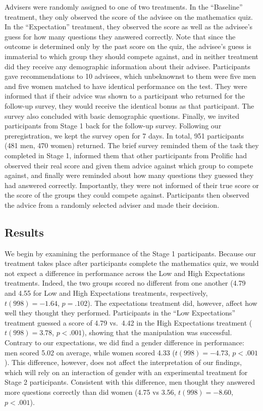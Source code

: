\documentclass[
  man,floatsintext]{apa6}
\begin{document}
Advisers were randomly assigned to one of two treatments. In the ``Baseline'' treatment, they only observed the score of the advisee on the mathematics quiz. In the ``Expectation'' treatment, they observed the score as well as the advisee's guess for how many questions they answered correctly. Note that since the outcome is determined only by the past score on the quiz, the advisee's guess is immaterial to which group they should compete against, and in neither treatment did they receive any demographic information about their advisee. Participants gave recommendations to 10 advisees, which unbeknownst to them were five men and five women matched to have identical performance on the test. They were informed that if their advice was shown to a participant who returned for the follow-up survey, they would receive the identical bonus as that participant. The survey also concluded with basic demographic questions.
Finally, we invited participants from Stage 1 back for the follow-up survey. Following our preregistration, we kept the survey open for 7 days. In total, 951 participants (481 men, 470 women) returned. The brief survey reminded them of the task they completed in Stage 1, informed them that other participants from Prolific had observed their real score and given them advice against which group to compete against, and finally were reminded about how many questions they guessed they had answered correctly. Importantly, they were not informed of their true score or the score of the groups they could compete against. Participants then observed the advice from a randomly selected adviser and made their decision.

\hypertarget{results}{%
\subsection{Results}\label{results}}

We begin by examining the performance of the Stage 1 participants. Because our treatment takes place after participants complete the mathematics quiz, we would not expect a difference in performance across the Low and High Expectations treatments. Indeed, the two groups scored no different from one another (4.79 and 4.55 for Low and High Expectations treatments, respectively, \(t(998) = -1.64\), \(p = .102\)). The expectations treatment did, however, affect how well they thought they performed. Participants in the ``Low Expectations'' treatment guessed a score of 4.79 vs.~4.42 in the High Expectations treatment (\(t(998) = 3.78\), \(p < .001\)), showing that the manipulation was successful. Contrary to our expectations, we did find a gender difference in performance: men scored 5.02 on average, while women scored 4.33 (\(t(998) = -4.73\), \(p < .001\)). This difference, however, does not affect the interpretation of our findings, which will rely on an interaction of gender with an experimental treatment for Stage 2 participants. Consistent with this difference, men thought they answered more questions correctly than did women (4.75 vs 3.56, \(t(998) = -8.60\), \(p < .001\)).
\end{document}

